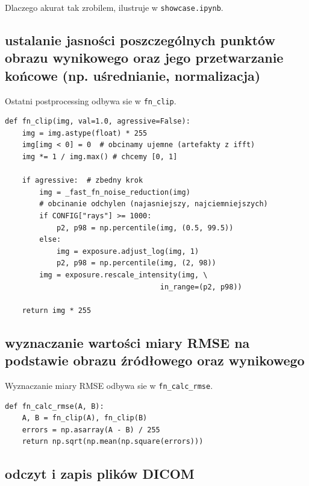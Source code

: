 \documentclass{bmvc2k}
\begin{document}
Dlaczego akurat tak zrobilem, ilustruje w {\tt showcase.ipynb}.

\subsection{ustalanie jasności poszczególnych punktów obrazu wynikowego oraz
	jego przetwarzanie końcowe (np. uśrednianie, normalizacja)}

Ostatni postprocessing odbywa sie w {\tt fn\_clip}.

\begin{verbatim}
def fn_clip(img, val=1.0, agressive=False):
    img = img.astype(float) * 255
    img[img < 0] = 0  # obcinamy ujemne (artefakty z ifft)
    img *= 1 / img.max() # chcemy [0, 1]

    if agressive:  # zbedny krok
        img = _fast_fn_noise_reduction(img)
        # obcinanie odchylen (najasniejszy, najciemniejszych)
        if CONFIG["rays"] >= 1000:
            p2, p98 = np.percentile(img, (0.5, 99.5))
        else:
            img = exposure.adjust_log(img, 1)
            p2, p98 = np.percentile(img, (2, 98))
        img = exposure.rescale_intensity(img, \
                                    in_range=(p2, p98))

    return img * 255
\end{verbatim}

\subsection{wyznaczanie wartości miary RMSE na podstawie obrazu źródłowego oraz
	wynikowego}

Wyznaczanie miary RMSE odbywa sie w {\tt fn\_calc\_rmse}.

\begin{verbatim}
def fn_calc_rmse(A, B):
    A, B = fn_clip(A), fn_clip(B)
    errors = np.asarray(A - B) / 255
    return np.sqrt(np.mean(np.square(errors)))
\end{verbatim}

\subsection{odczyt i zapis plików DICOM}
\end{document}
